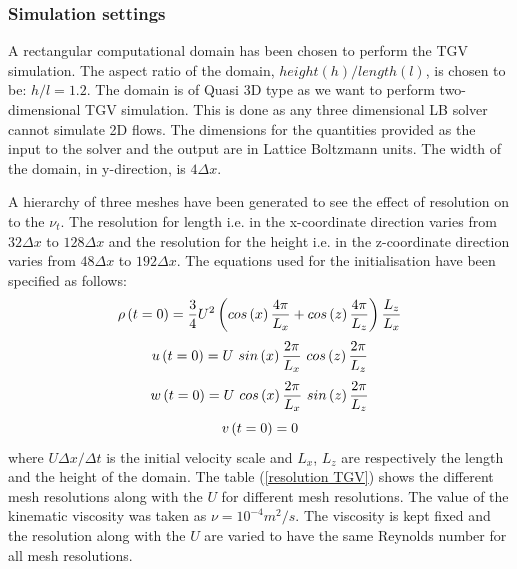 \subsubsection{Simulation settings}

A rectangular computational domain has been chosen to perform the TGV simulation. The aspect ratio of the domain, $height (h)/length(l)$, is chosen to be: $h/l = 1.2$. The domain is of Quasi 3D type as we want to perform two-dimensional TGV simulation. This is done as any three dimensional LB solver cannot simulate 2D flows. The dimensions for the quantities provided as the input to the solver and the output are in Lattice Boltzmann units. The width of the domain, in y-direction, is $4\Delta x$. 

A hierarchy of three meshes have been generated to see the effect of resolution on to the $\nu_t$. The resolution for length i.e. in the x-coordinate direction varies from $32\Delta x$ to $128\Delta x$ and the resolution for the height i.e. in the z-coordinate direction varies from $48\Delta x$ to $192\Delta x$. 
The equations used for the initialisation have been specified as follows:
%
\begin{equation}
\label{TGV den}
\rho\left(t=0\right) = \frac{3}{4} U^2 \left(cos\left(x\right)\frac{4\pi}{L_x} + cos\left(z\right)\frac{4\pi}{L_z}\right)\frac{L_z}{L_x}\\
\end{equation}
%
%
\begin{equation}
\label{TGV u}
u\left(t=0\right) = U\ sin\left(x\right)\frac{2\pi}{L_x}\ cos\left(z\right)\frac{2\pi}{L_z}\\
\end{equation}
%
%
\begin{equation}
\label{TGV w}
w\left(t=0\right) = U\ cos\left(x\right)\frac{2\pi}{L_x}\ sin\left(z\right)\frac{2\pi}{L_z}\\
\end{equation}
%
%
\begin{equation}
\label{TGV v}
v\left(t=0\right) = 0\\
\end{equation}
%
where $U \Delta x / \Delta t$ is the initial velocity scale and $L_x$, $L_z$ are respectively the length and the height of the domain. The table (\ref{resolution TGV}) shows the different mesh resolutions along with the $U$ for different mesh resolutions. The value of the kinematic viscosity was taken as $\nu = 10^{-4} m^2/s$. The viscosity is kept fixed and the resolution along with the $U$ are varied to have the same Reynolds number for all mesh resolutions. 
